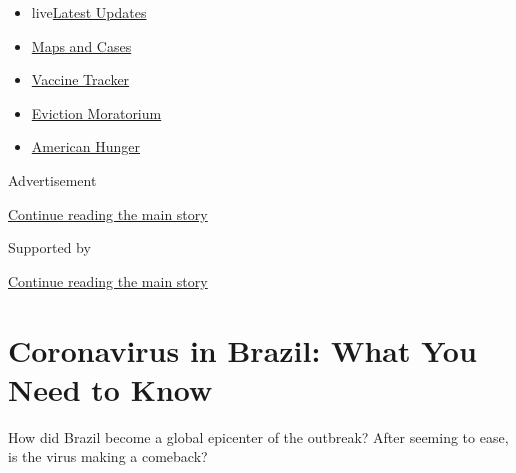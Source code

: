 \begin{itemize}
\tightlist
\item
  live\href{https://www.nytimes3xbfgragh.onion/2020/09/08/world/covid-19-coronavirus.html?name=styln-coronavirus-national\&region=TOP_BANNER\&block=storyline_menu_recirc\&action=click\&pgtype=Article\&impression_id=4ef1c320-f1d0-11ea-bd53-232e4c613195\&variant=undefined}{Latest
  Updates}
\item
  \href{https://www.nytimes3xbfgragh.onion/interactive/2020/us/coronavirus-us-cases.html?name=styln-coronavirus-national\&region=TOP_BANNER\&block=storyline_menu_recirc\&action=click\&pgtype=Article\&impression_id=4ef1c321-f1d0-11ea-bd53-232e4c613195\&variant=undefined}{Maps
  and Cases}
\item
  \href{https://www.nytimes3xbfgragh.onion/interactive/2020/science/coronavirus-vaccine-tracker.html?name=styln-coronavirus-national\&region=TOP_BANNER\&block=storyline_menu_recirc\&action=click\&pgtype=Article\&impression_id=4ef1c322-f1d0-11ea-bd53-232e4c613195\&variant=undefined}{Vaccine
  Tracker}
\item
  \href{https://www.nytimes3xbfgragh.onion/2020/09/02/your-money/eviction-moratorium-covid.html?name=styln-coronavirus-national\&region=TOP_BANNER\&block=storyline_menu_recirc\&action=click\&pgtype=Article\&impression_id=4ef1c323-f1d0-11ea-bd53-232e4c613195\&variant=undefined}{Eviction
  Moratorium}
\item
  \href{https://www.nytimes3xbfgragh.onion/interactive/2020/09/02/magazine/food-insecurity-hunger-us.html?name=styln-coronavirus-national\&region=TOP_BANNER\&block=storyline_menu_recirc\&action=click\&pgtype=Article\&impression_id=4ef1c324-f1d0-11ea-bd53-232e4c613195\&variant=undefined}{American
  Hunger}
\end{itemize}

Advertisement

\protect\hyperlink{after-top}{Continue reading the main story}

Supported by

\protect\hyperlink{after-sponsor}{Continue reading the main story}

\hypertarget{coronavirus-in-brazil-what-you-need-to-know}{%
\section{Coronavirus in Brazil: What You Need to
Know}\label{coronavirus-in-brazil-what-you-need-to-know}}

How did Brazil become a global epicenter of the outbreak? After seeming
to ease, is the virus making a comeback?

